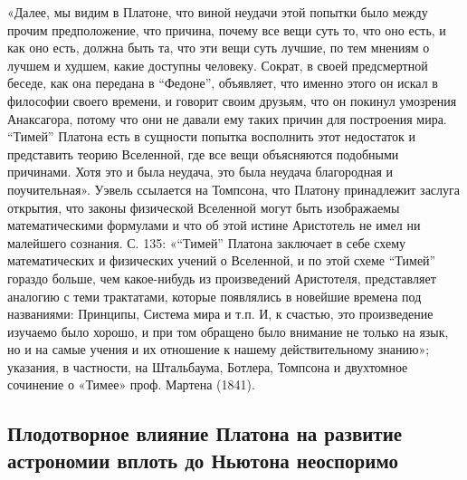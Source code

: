 «Далее,  мы видим  в  Платоне,  что виной  неудачи  этой попытки  было
между  прочим предположение,  что причина,  почему все  вещи суть  то,
что  оно  есть,  и  как  оно  есть,  должна  быть  та,  что  эти  вещи
суть  лучшие,  по  тем  мнениям  о лучшем  и  худшем,  какие  доступны
человеку.  Сократ,  в  своей  предсмертной беседе,  как  она  передана
в  ``Федоне'',  объявляет,  что  именно этого  он  искал  в  философии
своего  времени, и  говорит своим  друзьям, что  он покинул  умозрения
Анаксагора, потому что  они не давали ему таких  причин для построения
мира.  ``Тимей''  Платона  есть  в сущности  попытка  восполнить  этот
недостаток и  представить теорию  Вселенной, где все  вещи объясняются
подобными  причинами.  Хотя  это  и была  неудача,  это  была  неудача
благородная и поучительная». Уэвель ссылается на Томпсона, что Платону
принадлежит заслуга  открытия, что  законы физической  Вселенной могут
быть  изображаемы  математическими  формулами  и что  об  этой  истине
Аристотель не имел  ни малейшего сознания. С.  135: «``Тимей'' Платона
заключает в себе схему математических и физических учений о Вселенной,
и  по  этой  схеме  ``Тимей''  гораздо  больше,  чем  какое-нибудь  из
произведений  Аристотеля,  представляет  аналогию с  теми  трактатами,
которые  появлялись  в  новейшие  времена  под  названиями:  Принципы,
Система  мира и  т.п. И,  к  счастью, это  произведение изучаемо  было
хорошо,  и при  том обращено  было внимание  не только  на язык,  но и
на  самые учения  и  их отношение  к  нашему действительному  знанию»;
указания, в  частности, на Штальбаума, Ботлера,  Томпсона и двухтомное
сочинение о «Тимее» проф. Мартена (1841).

\subsection{Плодотворное влияние Платона на развитие астрономии вплоть
до Ньютона неоспоримо}

